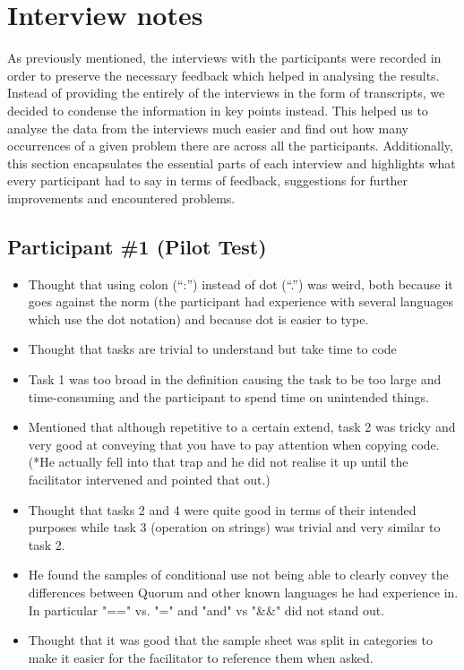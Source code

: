 \chapter{Interview notes}
As previously mentioned, the interviews with the participants were recorded in order to preserve the necessary feedback which helped in analysing the results. Instead of providing the entirely of the interviews in the form of transcripts, we decided to condense the information in key points instead. This helped us to analyse the data from the interviews much easier and find out how many occurrences of a given problem there are across all the participants. Additionally, this section encapsulates the essential parts of each interview and highlights what every participant had to say in terms of feedback, suggestions for further improvements and encountered problems.
\section{Participant {\#}1 (Pilot Test)}
\begin{itemize}
\item Thought that using colon (“:”) instead of dot (“.”) was weird, both because it goes against the norm (the participant had experience with several languages which use the dot notation) and because dot is easier to type. 
\item Thought that tasks are trivial to understand but take time to code
\item Task 1 was too broad in the definition causing the task to be too large and time-consuming and the participant to spend time on unintended things.
\item Mentioned that although repetitive to a certain extend, task 2 was tricky and very good at conveying that you have to pay attention when copying code. 
(*He actually fell into that trap and he did not realise it up until the facilitator intervened and pointed that out.) 
\item Thought that tasks 2 and 4 were quite good in terms of their intended purposes while task 3 (operation on strings) was trivial and very similar to task 2. 
\item He found the samples of conditional use not being able to clearly convey the differences between Quorum and other known languages he had experience in. In particular "==" vs. "=" and "and" vs "\&\&" did not stand out.
\item Thought that it was good that the sample sheet was split in categories to make it easier for the facilitator to reference them when asked.
\end{itemize}
